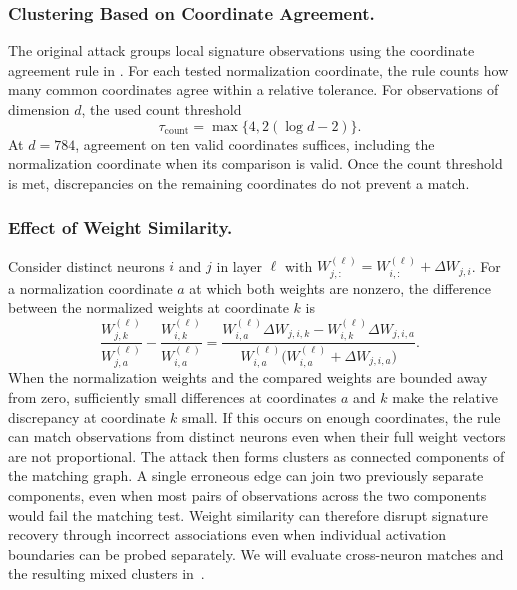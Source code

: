 \documentclass[runningheads]{llncs}
\begin{document}
\subsubsection{Clustering Based on Coordinate Agreement.}
The original attack groups local signature observations using the coordinate agreement rule in .
For each tested normalization coordinate, the rule counts how many common coordinates agree within a relative tolerance.
For observations of dimension $d$, the used count threshold
\begin{equation*}
\tau_{\mathrm{count}}=\max\{4,2(\log d-2)\}.
\end{equation*}
At $d=784$, agreement on ten valid coordinates suffices, including the normalization coordinate when its comparison is valid.
Once the count threshold is met, discrepancies on the remaining coordinates do not prevent a match.

\subsubsection{Effect of Weight Similarity.}
Consider distinct neurons $i$ and $j$ in layer $\ell$ with $W_{j,:}^{(\ell)}=W_{i,:}^{(\ell)}+\Delta W_{j,i}$.
For a normalization coordinate $a$ at which both weights are nonzero, the difference between the normalized weights at coordinate $k$ is
\begin{equation*}
\frac{W_{j,k}^{(\ell)}}{W_{j,a}^{(\ell)}}-\frac{W_{i,k}^{(\ell)}}{W_{i,a}^{(\ell)}}=\frac{W_{i,a}^{(\ell)}\Delta W_{j,i,k}-W_{i,k}^{(\ell)}\Delta W_{j,i,a}}{W_{i,a}^{(\ell)}\bigl(W_{i,a}^{(\ell)}+\Delta W_{j,i,a}\bigr)}.
\end{equation*}
When the normalization weights and the compared weights are bounded away from zero, sufficiently small differences at coordinates $a$ and $k$ make the relative discrepancy at coordinate $k$ small.
If this occurs on enough coordinates, the rule can match observations from distinct neurons even when their full weight vectors are not proportional.
The attack then forms clusters as connected components of the matching graph.
A single erroneous edge can join two previously separate components, even when most pairs of observations across the two components would fail the matching test.
Weight similarity can therefore disrupt signature recovery through incorrect associations even when individual activation boundaries can be probed separately.
We will evaluate cross-neuron matches and the resulting mixed clusters in~.
\end{document}

